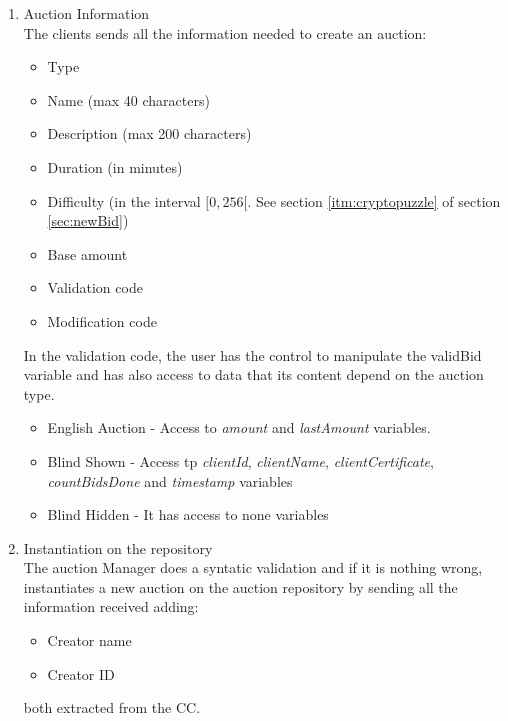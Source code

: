 \documentclass[12pt]{article}
\begin{document}
\begin{enumerate}
  \item Auction Information \\
    The clients sends all the information needed to create an auction:
    \begin{itemize}
      \item Type
      \item Name (max 40 characters)
      \item Description (max 200 characters)
      \item Duration (in minutes)
      \item Difficulty (in the interval \([0,256[\). See section \ref{itm:cryptopuzzle} of section
         \ref{sec:newBid})
      \item Base amount
      \item Validation code
      \item Modification code
    \end{itemize}
    
    In the validation code, the user has the control to manipulate the validBid variable and has also access to data that its content
    depend on the auction type.

    \begin{itemize}
      \item English Auction - Access to \textit{amount} and \textit{lastAmount} variables.
      \item Blind Shown - Access tp \textit{clientId}, \textit{clientName}, \textit{clientCertificate}, \textit{countBidsDone} and \textit{timestamp} 
      variables
      \item Blind Hidden - It has access to none variables  
    \end{itemize}


  \item Instantiation on the repository \\
    The auction Manager does a syntatic validation and if it is nothing wrong, instantiates a new auction on the auction repository by sending all the 
      information received adding:
    \begin{itemize}
      \item Creator name
      \item Creator ID
    \end{itemize}
    both extracted from the CC.


\end{enumerate}
\end{document}
